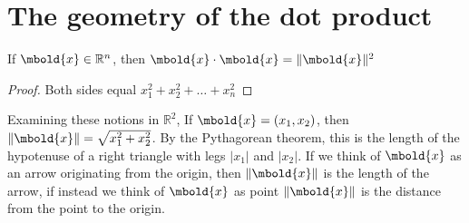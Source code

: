 \documentclass[12pt letter]{report}
\begin{document}

\section{The geometry of the dot product}


\begin{prop}[]
  If $\mbold{x} \in \mathbb{R}^{n}$, then $\mbold{x} \cdot \mbold{x} = \|\mbold{x}\|^2$
  \begin{proof}
    Both sides equal $x_1^2 + x_2^2 + \ldots + x_n^2$
  \end{proof}

\end{prop}

Examining these notions in $\mathbb{R}^2$, If $\mbold{x} = \left( x_1, x_2 \right) $, then $\|\mbold{x}\| = \sqrt{x_1^2
    + x_2^2} $. By the Pythagorean theorem, this is the length of the hypotenuse of a right triangle with legs $\left| x_1
  \right|$ and $\left| x_2 \right|$. If we think of $\mbold{x}$ as an arrow originating from the origin, then
$\|\mbold{x}\|$ is the length of the arrow, if instead we think of $\mbold{x}$ as point $\|\mbold{x}\|$ is the
distance from the point to the origin.
\end{document}
